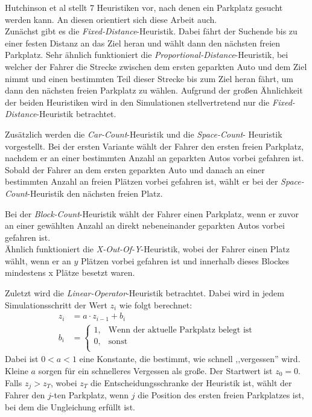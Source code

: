Hutchinson et al \cite[A Selection of Simple Parking Heuristics, S. 10]{hutchinson} stellt 7 Heuristiken vor, nach denen ein Parkplatz gesucht werden kann. An diesen orientiert sich diese Arbeit auch. \\
Zunächst gibt es die \emph{Fixed-Distance}-Heuristik. Dabei fährt der Suchende bis zu einer festen Distanz an das Ziel heran und wählt dann den nächsten freien Parkplatz. Sehr ähnlich funktioniert die \emph{Proportional-Distance}-Heuristik, bei welcher der Fahrer die Strecke zwischen dem ersten geparkten Auto und dem Ziel nimmt und einen bestimmten Teil dieser Strecke bis zum Ziel heran fährt, um dann den nächsten freien Parkplatz zu wählen. Aufgrund der großen Ähnlichkeit der beiden Heuristiken wird in den Simulationen stellvertretend nur die \emph{Fixed-Distance}-Heuristik betrachtet.

Zusätzlich werden die \emph{Car-Count}-Heuristik und die \emph{Space-Count}- Heuristik vorgestellt. Bei der ersten Variante wählt der Fahrer den ersten freien Parkplatz, nachdem er an einer bestimmten Anzahl an geparkten Autos vorbei gefahren ist. Sobald der Fahrer an dem ersten geparkten Auto und danach an einer bestimmten Anzahl an freien Plätzen vorbei gefahren ist, wählt er bei der \emph{Space-Count}-Heuristik den nächsten freien Platz.

Bei der \emph{Block-Count}-Heuristik wählt der Fahrer einen Parkplatz, wenn er zuvor an einer gewählten Anzahl an direkt nebeneinander geparkten Autos vorbei gefahren ist.\\
Ähnlich funktioniert die \emph{X-Out-Of-Y}-Heuristik, wobei der Fahrer einen Platz wählt, wenn er an $y$ Plätzen vorbei gefahren ist und innerhalb dieses Blockes mindestens x Plätze besetzt waren. 

Zuletzt wird die \emph{Linear-Operator}-Heuristik betrachtet. Dabei wird in jedem Simulationsschritt der Wert $z_i$ wie folgt berechnet: 
\begin{align}
z_i&=a\cdot z_{i-1}+b_i\\
b_i&=\left\lbrace\begin{matrix}
1, &\text{Wenn der aktuelle Parkplatz belegt ist}\\
0, &\text{sonst}\\
\end{matrix}\right.
\end{align}
Dabei ist $0<a<1$ eine Konstante, die bestimmt, wie schnell ,,vergessen'' wird. Kleine $a$ sorgen für ein schnelleres Vergessen als große. Der Startwert ist $z_0=0$.
Falls $z_j>z_T$, wobei $z_T$ die Entscheidungsschranke der Heuristik ist, wählt der Fahrer den $j$-ten Parkplatz, wenn $j$ die Position des ersten freien Parkplatzes ist, bei dem die Ungleichung erfüllt ist. 

